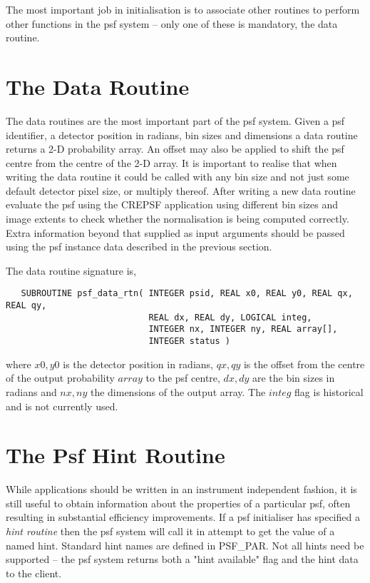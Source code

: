 The most important job in initialisation is to associate other routines
to perform other functions in the psf system -- only one of these is
mandatory, the data routine. 

\section{The Data Routine}

The data routines are the most important part of the psf system. Given
a psf identifier, a detector position in radians, bin sizes and dimensions
a data routine returns a 2-D probability array. An offset may also be
applied to shift the psf centre from the centre of the 2-D array. It is
important to realise that when writing the data routine it could be called
with any bin size and not just some default detector pixel size, or
multiply thereof. After writing a new data routine evaluate the psf using
the CREPSF application using different bin sizes and  image extents to
check whether the normalisation is being computed correctly. Extra
information beyond that supplied as input arguments should be passed
using the psf instance data described in the previous section.

The data routine signature is,
\begin{verbatim}
   SUBROUTINE psf_data_rtn( INTEGER psid, REAL x0, REAL y0, REAL qx, REAL qy, 
                            REAL dx, REAL dy, LOGICAL integ, 
                            INTEGER nx, INTEGER ny, REAL array[],
                            INTEGER status )
\end{verbatim}
where $x0,y0$ is the detector position in radians, $qx,qy$ is the offset
from the centre of the output probability $array$ to the psf centre,
$dx,dy$ are the bin sizes in radians and $nx,ny$ the dimensions of
the output array. The $integ$ flag is historical and is not currently
used.

\section{The Psf Hint Routine}

While applications should be written in an instrument independent fashion,
it is still useful to obtain information about the properties of a
particular psf, often resulting in substantial efficiency improvements.
If a psf initialiser has specified a {\em hint routine} then the psf system
will call it in attempt to get the value of a named hint. Standard hint
names are defined in PSF\_PAR. Not all hints need be supported -- the psf
system returns both a "hint available" flag and the hint data to the
client.

